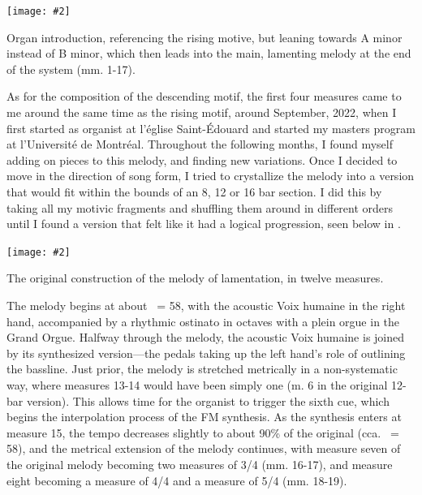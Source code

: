 \documentclass[12pt,twoside,maitrise]{dms_ks}
\newcommand{\customincludeexamples}[4][]{%
    \begin{example}[H]
        \centering
        \texttt{[image: \#2]}
        \caption{#4}
	\label{#3} 
    \end{example}
}
\theoremstyle{definition}
\begin{document}
{\customincludeexamples[width=\textwidth]{3e_2}{ex:3e_2}{Organ introduction, referencing the rising motive, but leaning towards A minor instead of B minor, which then leads into the main, lamenting melody at the end of the system (mm. 1-17).}

As for the composition of the descending motif, the first four measures came to me around the same time as the rising motif, around September, 2022, when I first started as organist at l'église Saint-Édouard and started my masters program at l'Université de Montréal.  
Throughout the following months, I found myself adding on pieces to this melody, and finding new variations.  
Once I decided to move in the direction of song form, I tried to crystallize the melody into a version that would fit within the bounds of an 8, 12 or 16 bar section. 
I did this by taking all my motivic fragments and shuffling them around in different orders until I found a version that felt like it had a logical progression, seen below in .  

\customincludeexamples[scale=0.6]{3e_3}{ex:3e_3}{The original construction of the melody of lamentation, in twelve measures.}

The melody begins at about \musQuarter\ = 58, with the acoustic Voix humaine in the right hand, accompanied by a rhythmic ostinato in octaves with a plein orgue in the Grand Orgue. 
Halfway through the melody, the acoustic Voix humaine is joined by its synthesized version---the pedals taking up the left hand's role of outlining the bassline. 
Just prior, the melody is stretched metrically in a non-systematic way, where measures 13-14 would have been simply one (m. 6 in the original 12-bar version). 
This allows time for the organist to trigger the sixth cue, which begins the interpolation process of the FM synthesis. 
As the synthesis enters at measure 15, the tempo decreases slightly to about 90\% of the original (cca. \musQuarter\ = 58), and the metrical extension of the melody continues, with measure seven of the original melody becoming two measures of 3/4 (mm. 16-17), and measure eight becoming a measure of 4/4 and a measure of 5/4 (mm. 18-19). 

}
\end{document}
